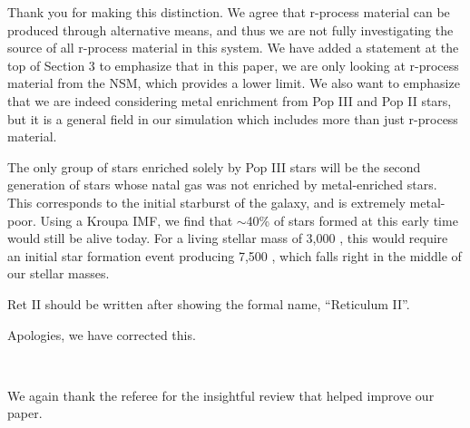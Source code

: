 \documentclass[11pt]{article}
\begin{document}

Thank you for making this distinction. We agree that r-process material can be produced through alternative means, and thus we are not fully investigating the source of all r-process material in this system. We have added a statement at the top of Section 3 to emphasize that in this paper, we are only looking at r-process material from the NSM, which provides a lower limit. We also want to emphasize that we are indeed considering metal enrichment from Pop III and Pop II stars, but it is a general field in our simulation which includes more than just r-process material.

The only group of stars enriched solely by Pop III stars will be the second generation of stars whose natal gas was not enriched by metal-enriched stars. This corresponds to the initial starburst of the galaxy, and is extremely metal-poor. Using a Kroupa IMF, we find that $\sim$40\% of stars formed at this early time would still be alive today. For a living stellar mass of 3,000 \Ms, this would require an initial star formation event producing 7,500 \Ms, which falls right in the middle of our stellar masses.

\begin{tcolorbox}[colback={lightgray}] 
Ret II should be written after showing the formal name, “Reticulum II”.
\end{tcolorbox} 

Apologies, we have corrected this. 

\

We again thank the referee for the insightful review that helped improve our paper.



\end{document}
